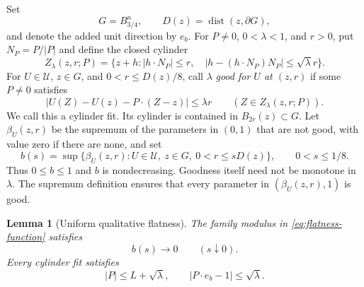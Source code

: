 \documentclass[11pt]{article}
\numberwithin{equation}{section}
\newtheorem{lemma}[theorem]{Lemma}
\theoremstyle{definition}
\theoremstyle{remark}
\begin{document}
Set
\[
  G=B_{3/4}^n,\qquad D(z)=\operatorname{dist}(z,\partial G),
\]
and denote the added unit direction by $e_b$. For $P\ne0$, $0<\lambda<1$, and $r>0$, put $N_P=P/|P|$ and define the closed cylinder
\[
  Z_\lambda(z,r;P)
   =\{z+h: |h\cdot N_P|\le r,\quad
               |h-(h\cdot N_P)N_P|\le\sqrt\lambda r\}.
\]
For $U\in\mathcal U$, $z\in G$, and $0<r\le D(z)/8$, call $\lambda$ \emph{good for $U$ at $(z,r)$} if some $P\ne0$ satisfies
\begin{equation}\label{eq:physical-fit}
  |U(Z)-U(z)-P\cdot(Z-z)|\le\lambda r
       \qquad (Z\in Z_\lambda(z,r;P)).
\end{equation}
We call this a cylinder fit. Its cylinder is contained in $B_{2r}(z)\subset G$. Let $\beta_U(z,r)$ be the supremum of the parameters in $(0,1)$ that are not good, with value zero if there are none, and set
\begin{equation}\label{eq:flatness-function}
  b(s)=\sup\{\beta_U(z,r):U\in\mathcal U,\ z\in G,
                        \ 0<r\le sD(z)\},\qquad 0<s\le1/8.
\end{equation}
Thus $0\le b\le1$ and $b$ is nondecreasing. Goodness itself need not be monotone in $\lambda$. The supremum definition ensures that every parameter in $(\beta_U(z,r),1)$ is good.

\begin{lemma}[Uniform qualitative flatness]\label{lem:family-flatness}
The family modulus in \eqref{eq:flatness-function} satisfies
\begin{equation}\label{eq:family-flatness}
  b(s)\longrightarrow0\qquad(s\downarrow0).
\end{equation}
Every cylinder fit satisfies
\begin{equation}\label{eq:physical-slope-bounds}
  |P|\le L+\sqrt\lambda,\qquad
  |P\cdot e_b-1|\le\sqrt\lambda.
\end{equation}
\end{lemma}
\end{document}
